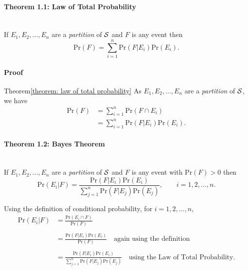 \paragraph{Theorem 1.1: Law of Total Probability}{\label{theorem: law of total probability} ~\\
If $E_1,E_2,\ldots,E_n$ are a {\it partition} of ${\cal S}$ and $F$ is
any event then
$$
\text{Pr}(F)=\sum_{i=1}^n \text{Pr}(F|E_i)\text{Pr}(E_i).
$$}
\paragraph{Proof}{Theorem}{\ref{theorem: law of total probability}}
As $E_1,E_2,\ldots,E_n$ are a {\it partition} of ${\cal S}$, we have
\begin{align*}
\text{Pr}(F)&=\sum_{i=1}^n \text{Pr}(F\cap E_i) \\
&=\sum_{i=1}^n \text{Pr}(F|E_i)\text{Pr}(E_i).
\end{align*}
\paragraph{Theorem 1.2: Bayes Theorem}{\label{theorem: bayes} ~\\
If $E_1,E_2,\ldots,E_n$ are a {\it partition} of ${\cal S}$ and $F$ is
any event with $\text{Pr}(F)>0$ then
$$\text{Pr}(E_i|F)=\frac{\text{Pr}(F|E_i)\text{Pr}(E_i)}{\sum_{j=1}^n \text{Pr}(F|E_j)\text{Pr}(E_j)},
\quad\quad i=1,2,\ldots,n. $$}

\begin{gapbox}


{
Using the definition of conditional probability, for $i=1,2,\ldots,n$,
\begin{align*}
\text{Pr}(E_i|F)&=\frac{\text{Pr}(E_i\cap F)}{\text{Pr}(F)} \\
                & \\
&=\frac{\text{Pr}(F|E_i)\text{Pr}(E_i)}{\text{Pr}(F)} \quad\text{again using the
definition}\\ 
            & \\
&=\frac{\text{Pr}(F|E_i)\text{Pr}(E_i)}{\sum_{j=1}^n \text{Pr}(F|E_j)\text{Pr}(E_j)}
\quad\text{using the Law of Total Probability}.
\end{align*}
}

\end{gapbox}




